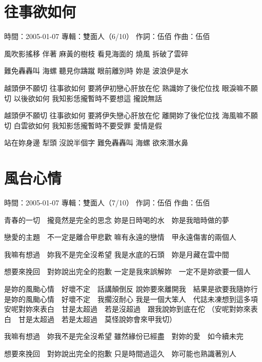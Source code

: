 \documentclass[UTF8,a4paper,oneside,twocolumn,12pt]{ctexbook}
\newcommand{\infopair}[2]{\textbullet #1：#2}
\newcommand{\zc}[1][伍佰]{\infopair{作詞}{#1}}
\newcommand{\zq}[1][伍佰]{\infopair{作曲}{#1}}
\newcommand{\zj}[1]{\infopair{專輯}{#1}}
\newcommand{\sj}[1]{\infopair{時間}{#1}}
\newenvironment{info}{\begin{flushleft}\kaishu
	}
	{\end{flushleft}\normalsize\yahei\par}
\newenvironment{lyric}{
	}
{}
\begin{document}
\section{往事欲如何}
\begin{info}
	\sj{2005-01-07}
	\zj{雙面人（6/10）}
	\zc
	\zq
\end{info}
\begin{lyric}
	風吹影搖移 伴著 麻黃的樹枝
	看見海面的 燒風 拆破了雲碎

	難免轟轟叫 海螺 聽見你躊蹴
	眼前離別時 妳是 波浪伊是水

	越頭伊不願切 往事欲如何
	要將伊初戀心肝放在佗 熟識妳了後佗位找
	眼淚嘛不願切 以後欲如何
	我知影恁攏暫時不要想這 攏說無話

	越頭伊不願切 往事欲如何
	要將伊失戀心肝放在佗 離開妳了後佗位找
	海風嘛不願切 白雲欲如何
	我知影恁攏暫時不要受罪 愛情是假

	站在妳身邊 犁頭 沒說半個字
	難免轟轟叫 海螺 欲來潛水鼻
\end{lyric}

\section{風台心情}
\begin{info}
	\sj{2005-01-07}
	\zj{雙面人（7/10）}
	\zc
	\zq
\end{info}
\begin{lyric}
	青春的一切　攏竟然是完全的思念
	妳是日時喝的水　妳是我暗時做的夢

	戀愛的主題　不一定是離合甲悲歡
	嘛有永遠的戀情　甲永遠傷害的兩個人

	我嘛有想過　妳我不是完全沒希望
	我是水底的石頭　妳是月藏在雲中間

	想要來挽回　對妳說出完全的抱歉
	一定是我來誤解妳　一定不是妳欲要一個人

	是妳的風颱心情　好壞不定　話講顛倒反
	說妳要來離開我　結果是欲要我隨妳行
	是妳的風颱心情　好壞不定　我擱沒耐心
	我是一個大笨人　代誌未凍想到這多項
	安呢對妳來表白　甘是太超過　若是沒超過　跟我說妳到底在佗
	（安呢對妳來表白　甘是太超過　若是太超過　莫怪說妳會來甲我切）

	我嘛有想過　妳我不是完全沒希望
	雖然緣份已經盡　對妳的愛　如今續未完

	想要來挽回　對妳說出完全的抱歉
	只是時間過這久　妳可能也熟識著別人
\end{lyric}
\end{document}

